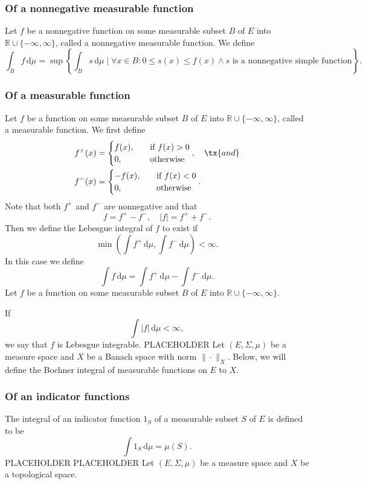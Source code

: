 \documentclass[a4paper,12pt]{report}
\begin{document}
\begin{itemize}
\begin{itemize}
\subsubsection{Of a nonnegative measurable function}
Let $f$ be a nonnegative function on some measurable subset $B$ of $E$ into $\mathbb{R}\cup\{-\infty,\infty\}$, called a nonnegative measurable function. We define
\[\int_Bf\,\mathrm{d}\mu=\sup\left\{\int_Bs\,\mathrm{d}\mu\mid\forall x\in B\colon 0\leq s(x)\leq f(x)\land s\text{\ is a nonnegative simple function}\right\}.\]
\subsubsection{Of a measurable function}
Let $f$ be a function on some measurable subset $B$ of $E$ into $\mathbb{R}\cup\{-\infty,\infty\}$, called a measurable function. We first define
\[\begin{aligned}
f^{+}(x)&=
\begin{cases}
f(x),\quad&\text{if\ }f(x)>0\\
0,\quad &\text{otherwise}
\end{cases},\quad\tx{and}\\
f^{-}(x)&=
\begin{cases}
-f(x),\quad&\text{if\ }f(x)<0\\
0,\quad&\text{otherwise}
\end{cases}.
\end{aligned}\]
Note that both $f^+$ and $f^-$ are nonnegative and that
\[f=f^+-f^-,\quad |f|=f^++f^-.\]
Then we define the Lebesgue integral of $f$ to exist if
\[ \min \left(\int f^{+}\,\mathrm{d}\mu ,\int f^{-}\,\mathrm{d}\mu \right)<\infty.\]
In this case we define
\[ \int f\,\mathrm{d}\mu =\int f^{+}\,\mathrm{d}\mu -\int f^{-}\,\mathrm{d}\mu.\]
Let $f$ be a function on some measurable subset $B$ of $E$ into $\mathbb{R}\cup\{-\infty,\infty\}$.

If
\[\int |f|\,\mathrm {d} \mu <\infty ,\]
we say that $f$ is Lebesgue integrable.
PLACEHOLDER
Let $(E,\Sigma ,\mu )$ be a measure space and $X$ be a Banach space with norm $\|\cdot\|_X$. Below, we will define the Bochner integral of measurable functions on $E$ to $X$.
\subsubsection{Of an indicator functions}
The integral of an indicator function $1_S$ of a measurable subset $S$ of $E$ is defined to be
\[\int 1_{S}\,\mathrm{d}{\mu} =\mu (S).\]
PLACEHOLDER
PLACEHOLDER
Let $(E,\Sigma,\mu)$ be a measure space and $X$ be a topological space. 


\end{itemize}
\end{itemize}
\end{document}
